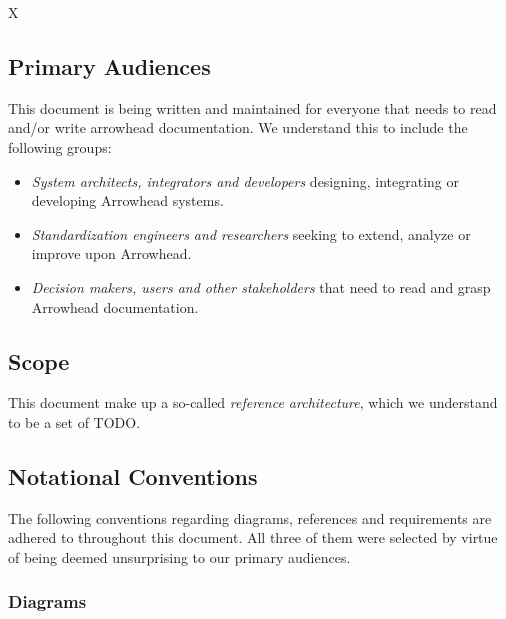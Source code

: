 %
%

X \cite{palm2021reference}

\subsection{Primary Audiences}
\label{sec:introduction:audiences}

This document is being written and maintained for everyone that needs to read and/or write arrowhead documentation.
We understand this to include the following groups:

\begin{itemize}
\item \textit{System architects, integrators and developers} designing, integrating or developing Arrowhead systems.
\item \textit{Standardization engineers and researchers} seeking to extend, analyze or improve upon Arrowhead.
\item \textit{Decision makers, users and other stakeholders} that need to read and grasp Arrowhead documentation.
\end{itemize}

\subsection{Scope}
\label{sec:introduction:scope}

This document make up a so-called \textit{reference architecture}, which we understand to be a set of TODO.

\subsection{Notational Conventions}
\label{sec:introduction:conventions}

The following conventions regarding diagrams, references and requirements are adhered to throughout this document.
All three of them were selected by virtue of being deemed unsurprising to our primary audiences.

\subsubsection{Diagrams}


